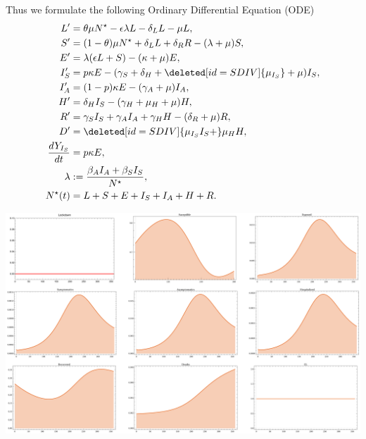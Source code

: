 Thus we formulate the following Ordinary Differential Equation (ODE)
\begin{equation}
	\label{eqn:base_dynamics}
    \begin{aligned}
        L' & = \theta \mu N^{\star}
        	-\epsilon \lambda L - \delta_L L - \mu L,
        \\
        S' & =
            (1 - \theta)\mu N^\star + \delta_L  L + \delta_R R
            - (\lambda + \mu) S,
        \\
        E' & =
            \lambda (\epsilon L + S) - (\kappa + \mu) E,
        \\
        I_S' & =
            p \kappa E -
            (\gamma_S +
                \delta_H +
                \deleted[id=SDIV]{\mu_{I_S}} +
                \mu) I_S,
        \\
        I_A' &=
            (1 - p) \kappa E - (\gamma_A + \mu) I_A,
        \\
        H' &=
            \delta_H I_S - (\gamma_H + \mu_H + \mu) H,
        \\
        R' & =
            \gamma_S I_S + \gamma_A I_A + \gamma_H H - (\delta_R + \mu) R,
        \\
        D' &=
            \deleted[id=SDIV]{\mu_{I_S} I_S +} \mu_H H,
        \\
        \frac{dY_{I_S}}{dt} &  = p \kappa E,
        \\
        \lambda &:=
            \frac{\beta_A I_A + \beta_S I_S}{N^{\star}},
        \\
        N^{\star}(t) &=
            L + S + E +
            I_S + I_A +
            H + R .
    \end{aligned}
\end{equation}
%
    \begin{center}
        \includegraphics[scale=0.25,
        keepaspectratio]{Figures/no_contraled_dynamics}
    \end{center}

